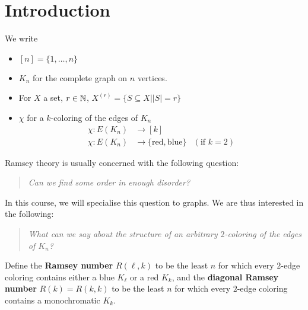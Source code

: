 \documentclass{article}
\begin{document}
\maketitle

\tableofcontents

\clearpage
\section{Introduction}

\newlec

\begin{notation}
  We write
  \begin{itemize}
    \item $[n] = \{1, \dots, n\}$
    \item $K_n$ for the complete graph on $n$ vertices.
    \item For $X$ a set, $r \in \mathbb N$, $X^{(r)} = \{S \subseteq X | |S| = r\}$
    \item $\chi$ for a $k$-coloring of the edges of $K_n$
      \begin{align*}
        \chi : E(K_n) & \to [k] \\
        \chi : E(K_n) & \to \{\text{red}, \text{blue}\} & (\text{if } k = 2)
      \end{align*}
  \end{itemize}
\end{notation}

Ramsey theory is usually concerned with the following question:

\begin{quotation}
  \textit{Can we find some order in enough disorder?}
\end{quotation}

In this course, we will specialise this question to graphs. We are thus interested in the following:

\begin{quotation}
  \textit{What can we say about the structure of an arbitrary $2$-coloring of the edges of $K_n$?}
\end{quotation}

\begin{defi}
  Define the {\bf Ramsey number} $R(\ell, k)$ to be the least $n$ for which every $2$-edge coloring contains either a blue $K_\ell$ or a red $K_k$, and the {\bf diagonal Ramsey number} $R(k) = R(k, k)$ to be the least $n$ for which every $2$-edge coloring contains a monochromatic $K_k$.
\end{defi}
\end{document}

